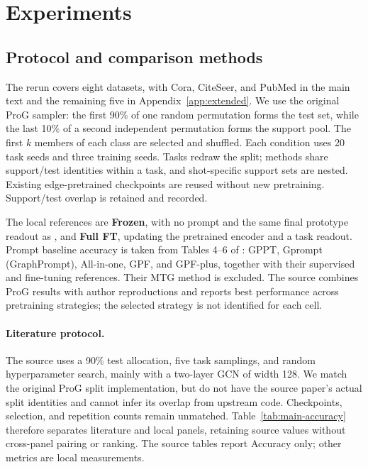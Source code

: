 \section{Experiments}
\subsection{Protocol and comparison methods}
\label{sec:protocol}



The rerun covers eight datasets, with Cora, CiteSeer, and PubMed in the main text and the remaining five in Appendix~\ref{app:extended}. We use the original ProG sampler: the first 90\% of one random permutation forms the test set, while the last 10\% of a second independent permutation forms the support pool. The first $k$ members of each class are selected and shuffled. Each condition uses 20 task seeds and three training seeds. Tasks redraw the split; methods share support/test identities within a task, and shot-specific support sets are nested. Existing edge-pretrained checkpoints are reused without new pretraining. Support/test overlap is retained and recorded.

The local references are \textbf{Frozen}, with no prompt and the same final prototype readout as \method, and \textbf{Full FT}, updating the pretrained encoder and a task readout. Prompt baseline accuracy is taken from Tables 4--6 of \citet{mtg2026}: GPPT, Gprompt (GraphPrompt), All-in-one, GPF, and GPF-plus, together with their supervised and fine-tuning references. Their MTG method is excluded. The source combines ProG results with author reproductions and reports best performance across pretraining strategies; the selected strategy is not identified for each cell.

\paragraph{Literature protocol.}
The source uses a 90\% test allocation, five task samplings, and random hyperparameter search, mainly with a two-layer GCN of width 128. We match the original ProG split implementation, but do not have the source paper's actual split identities and cannot infer its overlap from upstream code. Checkpoints, selection, and repetition counts remain unmatched. Table~\ref{tab:main-accuracy} therefore separates literature and local panels, retaining source values without cross-panel pairing or ranking. The source tables report Accuracy only; other metrics are local measurements.

